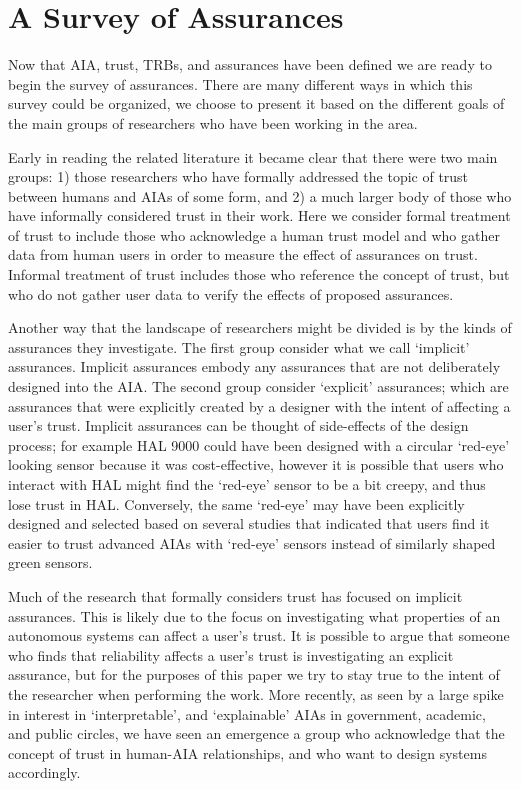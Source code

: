 

\section{A Survey of Assurances} \label{sec:survey}
Now that AIA, trust, TRBs, and assurances have been defined we are ready to begin the survey of assurances. There are many different ways in which this survey could be organized, we choose to present it based on the different goals of the main groups of researchers who have been working in the area.

Early in reading the related literature it became clear that there were two main groups: 1) those researchers who have formally addressed the topic of trust between humans and AIAs of some form, and 2) a much larger body of those who have informally considered trust in their work. Here we consider formal treatment of trust to include those who acknowledge a human trust model and who gather data from human users in order to measure the effect of assurances on trust. Informal treatment of trust includes those who reference the concept of trust, but who do not gather user data to verify the effects of proposed assurances. 

Another way that the landscape of researchers might be divided is by the kinds of assurances they investigate. The first group consider what we call `implicit' assurances. Implicit assurances embody any assurances that are not deliberately designed into the AIA. The second group consider `explicit' assurances; which are assurances that were explicitly created by a designer with the intent of affecting a user's trust. Implicit assurances can be thought of side-effects of the design process; for example HAL 9000 could have been designed with a circular `red-eye' looking sensor because it was cost-effective, however it is possible that users who interact with HAL might find the `red-eye' sensor to be a bit creepy, and thus lose trust in HAL. Conversely, the same `red-eye' may have been explicitly designed and selected based on several studies that indicated that users find it easier to trust advanced AIAs with `red-eye' sensors instead of similarly shaped green sensors.

Much of the research that formally considers trust has focused on implicit assurances. This is likely due to the focus on investigating what properties of an autonomous systems can affect a user's trust. It is possible to argue that someone who finds that reliability affects a user's trust is investigating an explicit assurance, but for the purposes of this paper we try to stay true to the intent of the researcher when performing the work. More recently, as seen by a large spike in interest in `interpretable', and `explainable' AIAs in government, academic, and public circles, we have seen an emergence a group who acknowledge that the concept of trust in human-AIA relationships, and who want to design systems accordingly.

